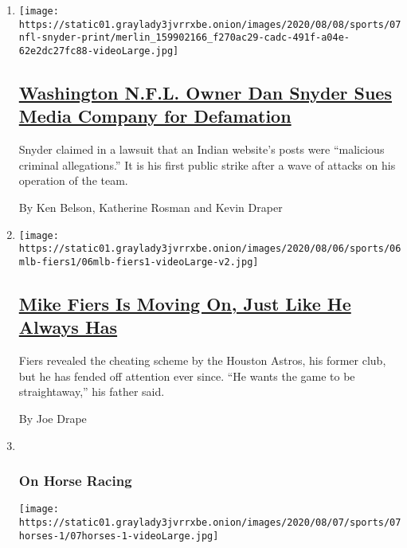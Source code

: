 \begin{enumerate}
\def\labelenumi{\arabic{enumi}.}
\item
  \texttt{[image: https://static01.graylady3jvrrxbe.onion/images/2020/08/08/sports/07nfl-snyder-print/merlin\_159902166\_f270ac29-cadc-491f-a04e-62e2dc27fc88-videoLarge.jpg]}

  \hypertarget{washington-nfl-owner-dan-snyder-sues-media-company-for-defamation}{%
  \subsection{\texorpdfstring{\href{/2020/08/07/sports/dan-snyder-washington-nfl-defamation-lawsuit.html}{Washington
  N.F.L. Owner Dan Snyder Sues Media Company for
  Defamation}}{Washington N.F.L. Owner Dan Snyder Sues Media Company for Defamation}}\label{washington-nfl-owner-dan-snyder-sues-media-company-for-defamation}}

  Snyder claimed in a lawsuit that an Indian website's posts were
  ``malicious criminal allegations.'' It is his first public strike
  after a wave of attacks on his operation of the team.

  By Ken Belson, Katherine Rosman and Kevin Draper
\item
  \texttt{[image: https://static01.graylady3jvrrxbe.onion/images/2020/08/06/sports/06mlb-fiers1/06mlb-fiers1-videoLarge-v2.jpg]}

  \hypertarget{mike-fiers-is-moving-on-just-like-he-always-has}{%
  \subsection{\texorpdfstring{\href{/2020/08/06/sports/as-mike-fiers-astros-cheating.html}{Mike
  Fiers Is Moving On, Just Like He Always
  Has}}{Mike Fiers Is Moving On, Just Like He Always Has}}\label{mike-fiers-is-moving-on-just-like-he-always-has}}

  Fiers revealed the cheating scheme by the Houston Astros, his former
  club, but he has fended off attention ever since. ``He wants the game
  to be straightaway,'' his father said.

  By Joe Drape
\item ~
  \hypertarget{on-horse-racing}{%
  \subsubsection{On Horse Racing}\label{on-horse-racing}}

  \texttt{[image: https://static01.graylady3jvrrxbe.onion/images/2020/08/07/sports/07horses-1/07horses-1-videoLarge.jpg]}


\end{enumerate}
